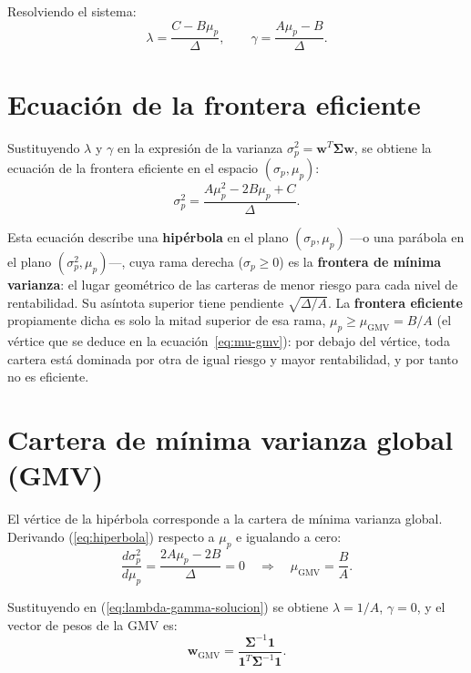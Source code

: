 Resolviendo el sistema:
\begin{equation}
    \lambda = \frac{C - B\mu_p}{\Delta}, \qquad
    \gamma = \frac{A\mu_p - B}{\Delta}.
    \label{eq:lambda-gamma-solucion}
\end{equation}

\section{Ecuación de la frontera eficiente}

Sustituyendo $\lambda$ y $\gamma$ en la expresión de la varianza
$\sigma_p^2 = \mathbf{w}^T \boldsymbol{\Sigma} \mathbf{w}$, se obtiene
la ecuación de la frontera eficiente en el espacio $(\sigma_p, \mu_p)$:
\begin{equation}
    \boxed{
    \sigma_p^2 = \frac{A \mu_p^2 - 2B \mu_p + C}{\Delta}.
    }
    \label{eq:hiperbola}
\end{equation}

Esta ecuación describe una \textbf{hipérbola} en el plano
$(\sigma_p, \mu_p)$ ---o una parábola en el plano $(\sigma_p^2, \mu_p)$---,
cuya rama derecha ($\sigma_p \ge 0$) es la \textbf{frontera de mínima
varianza}: el lugar geométrico de las carteras de menor riesgo para cada
nivel de rentabilidad. Su asíntota superior tiene pendiente
$\sqrt{\Delta / A}$. La \textbf{frontera eficiente} propiamente dicha es solo
la mitad superior de esa rama, $\mu_p \ge \mu_{\text{GMV}} = B/A$ (el vértice
que se deduce en la ecuación~\ref{eq:mu-gmv}): por debajo del vértice, toda
cartera está dominada por otra de igual riesgo y mayor rentabilidad, y por
tanto no es eficiente.

\section{Cartera de mínima varianza global (GMV)}

El vértice de la hipérbola corresponde a la cartera de mínima varianza
global. Derivando (\ref{eq:hiperbola}) respecto a $\mu_p$ e igualando a
cero:
\begin{equation}
    \frac{d\sigma_p^2}{d\mu_p}
    = \frac{2A\mu_p - 2B}{\Delta} = 0
    \quad \Longrightarrow \quad
    \boxed{\mu_{\text{GMV}} = \frac{B}{A}}.
    \label{eq:mu-gmv}
\end{equation}

Sustituyendo en (\ref{eq:lambda-gamma-solucion}) se obtiene $\lambda =
1/A$, $\gamma = 0$, y el vector de pesos de la GMV es:
\begin{equation}
    \boxed{\mathbf{w}_{\text{GMV}}
    = \frac{\boldsymbol{\Sigma}^{-1} \mathbf{1}}
           {\mathbf{1}^T \boldsymbol{\Sigma}^{-1} \mathbf{1}}.
    }
    \label{eq:w-gmv-analitica}
\end{equation}

